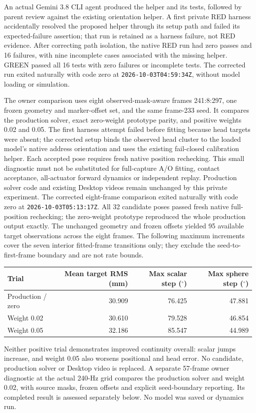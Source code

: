 \documentclass[11pt,a4paper]{article}
\begin{document}
An actual Gemini 3.8 CLI agent produced the helper and its tests, followed
by parent review against the existing orientation helper. A first private
RED harness accidentally resolved the proposed helper through its setup
path and failed its expected-failure assertion; that run is retained as a
harness failure, not RED evidence. After correcting path isolation, the
native RED run had zero passes and 16 failures, with nine incomplete cases
associated with the missing helper. GREEN passed all 16 tests with zero
failures or incomplete tests. The corrected run exited naturally with
code zero at \texttt{2026-10-03T04:59:34Z}, without model loading or simulation.

The owner comparison uses eight observed-mask-aware frames
241:8:297, one frozen geometry and marker-offset set, and the same frame-233
seed. It compares the production solver, exact zero-weight prototype parity,
and positive weights 0.02 and 0.05. The first harness attempt failed before fitting because head targets were absent; the corrected setup binds the observed head cluster to the loaded model's native address orientation and uses the existing fail-closed calibration helper. Each accepted pose requires fresh native
position rechecking. This small diagnostic must not be substituted for
full-capture A/O fitting, contact acceptance, all-actuator forward dynamics
or independent replay. Production solver code and existing Desktop videos
remain unchanged by this private experiment.
The corrected eight-frame comparison exited naturally with code zero at
\texttt{2026-10-03T05:13:17Z}. All 32 candidate poses passed fresh native
full-position rechecking; the zero-weight prototype reproduced the whole
production output exactly. The unchanged geometry and frozen offsets yielded
95 available target observations across the eight frames. The following
maximum increments cover the seven interior fitted-frame transitions only;
they exclude the seed-to-first-frame boundary and are not rate bounds.
\begin{center}
\begin{tabular}{lrrr}
\hline
Trial & Mean target RMS (mm) & Max scalar step ($^{\circ}$) & Max sphere step ($^{\circ}$)\\
\hline
Production / zero & 30.909 & 76.425 & 47.881\\
Weight 0.02 & 30.610 & 79.528 & 46.854\\
Weight 0.05 & 32.186 & 85.547 & 44.989\\
\hline
\end{tabular}
\end{center}
Neither positive trial demonstrates improved continuity overall: scalar
jumps increase, and weight 0.05 also worsens positional and head error.
No candidate, production solver or Desktop video is replaced. A separate
57-frame owner diagnostic at the actual 240-Hz grid compares the production solver and weight 0.02, with source masks, frozen offsets and explicit seed-boundary reporting. Its completed result is assessed separately below. No model was saved or dynamics run.
\end{document}
